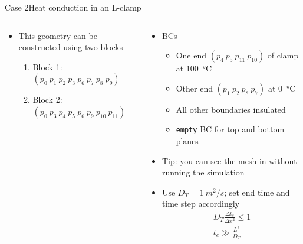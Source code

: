\begin{frame}{Case 2}{Heat conduction in an L-clamp}
\begin{columns}
\begin{column}{0.5\linewidth}
\begin{figure}
            \end{figure}
            \begin{itemize}
                \item This geometry can be constructed using two blocks
                \begin{enumerate}
                    \item Block 1: $(p_0 ~ p_1 ~ p_2 ~ p_3 ~ p_6 ~ p_7 ~ p_8 ~ p_9)$
                    \item Block 2: $(p_0 ~ p_3 ~ p_4 ~ p_5 ~ p_6 ~ p_9 ~ p_{10} ~ p_{11})$
                \end{enumerate}
            \end{itemize}
        \end{column}
        \begin{column}{0.5\linewidth}
            \begin{itemize}
                \item BCs
                \begin{itemize}
                    \item One end $(p_4 ~ p_5 ~ p_{11} ~ p_{10})$ of clamp at \qty{100}{\degreeCelsius}
                    \item Other end $(p_1 ~ p_2 ~ p_8 ~ p_7)$ at \qty{0}{\degreeCelsius}
                    \item All other boundaries insulated
                    \item \texttt{empty} BC for top and bottom planes
                \end{itemize}
	            \item Tip: you can see the mesh in \paraview{} without running the simulation
                \item Use $D_T=\qty{1}{m^2/s}$; set end time and time step accordingly
                \begin{gather*}
                    D_T \frac{\Delta t_s}{\Delta x^2} \le 1\\
                    t_e \gg \frac{L^2}{D_T}
                \end{gather*}
            \end{itemize}
        \end{column}
    \end{columns}
\end{frame}

